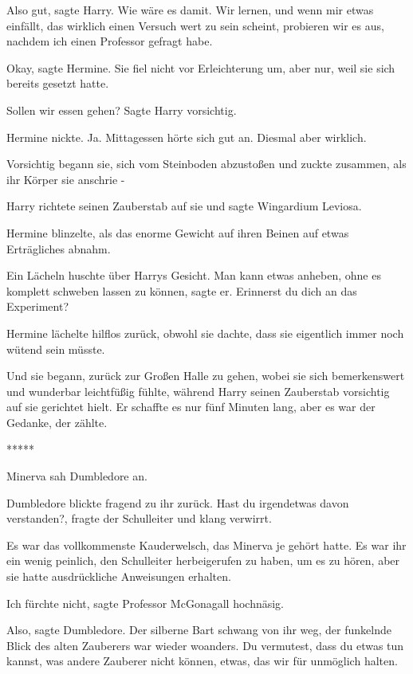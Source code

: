 \glqq{}Also gut\grqq{}, sagte Harry. \glqq{}Wie wäre es damit. Wir lernen, und
wenn mir etwas einfällt, das wirklich einen Versuch wert zu sein scheint,
probieren wir es aus, nachdem ich einen Professor gefragt habe.\grqq{}

\glqq{}Okay\grqq{}, sagte Hermine. Sie fiel nicht vor Erleichterung um, aber
nur, weil sie sich bereits gesetzt hatte.

\glqq{}Sollen wir essen gehen?\grqq{} Sagte Harry vorsichtig.

Hermine nickte. Ja. Mittagessen hörte sich gut an. Diesmal aber wirklich.

Vorsichtig begann sie, sich vom Steinboden abzustoßen und zuckte zusammen, als
ihr Körper sie anschrie -

Harry richtete seinen Zauberstab auf sie und sagte \glqq{}Wingardium
Leviosa\grqq{}.

Hermine blinzelte, als das enorme Gewicht auf ihren Beinen auf etwas
Erträgliches abnahm.

Ein Lächeln huschte über Harrys Gesicht. \glqq{}Man kann etwas anheben, ohne es
komplett schweben lassen zu können\grqq{}, sagte er. \glqq{}Erinnerst du dich an
das Experiment?\grqq{}

Hermine lächelte hilflos zurück, obwohl sie dachte, dass sie eigentlich immer
noch wütend sein müsste.

Und sie begann, zurück zur Großen Halle zu gehen, wobei sie sich bemerkenswert
und wunderbar leichtfüßig fühlte, während Harry seinen Zauberstab vorsichtig auf
sie gerichtet hielt. Er schaffte es nur fünf Minuten lang, aber es war der
Gedanke, der zählte.

\begin{center}*****\end{center}

Minerva sah Dumbledore an.

Dumbledore blickte fragend zu ihr zurück. \glqq{}Hast du irgendetwas davon
verstanden?\grqq{}, fragte der Schulleiter und klang verwirrt.

Es war das vollkommenste Kauderwelsch, das Minerva je gehört hatte. Es war ihr
ein wenig peinlich, den Schulleiter herbeigerufen zu haben, um es zu hören, aber
sie hatte ausdrückliche Anweisungen erhalten.

\glqq{}Ich fürchte nicht\grqq{}, sagte Professor McGonagall hochnäsig.

\glqq{}Also\grqq{}, sagte Dumbledore. Der silberne Bart schwang von ihr weg, der
funkelnde Blick des alten Zauberers war wieder woanders. \glqq{}Du vermutest,
dass du etwas tun kannst, was andere Zauberer nicht können, etwas, das wir für
unmöglich halten.\grqq{}

